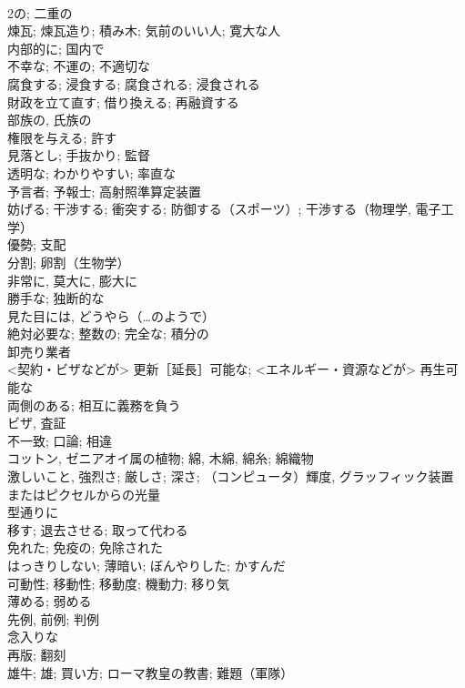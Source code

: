 \documentclass[8pt]{extreport}
\begin{document}
\begin{CJK}{UTF8}{min}
\\	2の; 二重の	
\\	煉瓦; 煉瓦造り; 積み木; 気前のいい人; 寛大な人	
\\	内部的に; 国内で	
\\	不幸な; 不運の; 不適切な	
\\	腐食する; 浸食する; 腐食される; 浸食される	
\\	財政を立て直す; 借り換える; 再融資する	
\\	部族の, 氏族の	
\\	権限を与える; 許す	
\\	見落とし; 手抜かり; 監督	
\\	透明な; わかりやすい; 率直な	
\\	予言者; 予報士; 高射照準算定装置	
\\	妨げる; 干渉する; 衝突する; 防御する（スポーツ）; 干渉する（物理学, 電子工学）	
\\	優勢; 支配	
\\	分割; 卵割（生物学）	
\\	非常に, 莫大に, 膨大に	
\\	勝手な; 独断的な	
\\	見た目には, どうやら（…のようで）	
\\	絶対必要な; 整数の; 完全な; 積分の	
\\	卸売り業者	
\\	<契約・ビザなどが> 更新［延長］可能な; <エネルギー・資源などが> 再生可能な	
\\	両側のある; 相互に義務を負う	
\\	ビザ, 査証	
\\	不一致; 口論; 相違	
\\	コットン, ゼニアオイ属の植物; 綿, 木綿, 綿糸; 綿織物	
\\	激しいこと, 強烈さ; 厳しさ; 深さ; （コンピュータ）輝度, グラッフィック装置またはピクセルからの光量	
\\	型通りに	
\\	移す; 退去させる; 取って代わる	
\\	免れた; 免疫の; 免除された	
\\	はっきりしない; 薄暗い; ぼんやりした; かすんだ	
\\	可動性; 移動性; 移動度; 機動力; 移り気	
\\	薄める; 弱める	
\\	先例, 前例; 判例	
\\	念入りな	
\\	再版; 翻刻	
\\	雄牛; 雄; 買い方; ローマ教皇の教書; 難題（軍隊）	

\end{CJK}
\end{document}
